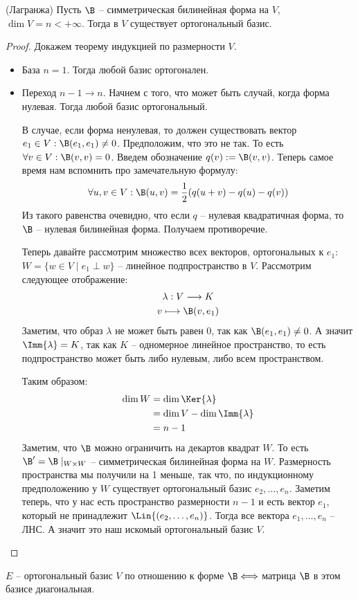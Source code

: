 \begin{theorem}
    (Лагранжа) Пусть $\B$ -- симметрическая билинейная форма на $V$, $\dim V = n < + \infty$. Тогда в $V$ существует ортогональный
    базис.
\end{theorem}
\begin{proof}
    Докажем теорему индукцией по размерности $V$. 
    \begin{itemize}
        \item База $n = 1$. Тогда любой базис ортогонален. 
        \item Переход $n-1 \to n$. Начнем с того, что может быть случай, когда форма нулевая. Тогда любой базис ортогональный. 
        
        В случае, если форма ненулевая, то должен существовать вектор $e_1 \in V : \B(e_1, e_1) \neq 0$. Предположим, что это не так. 
        То есть $\forall v \in V : \B(v, v) = 0$. Введем обозначение $q(v) := \B(v, v)$. Теперь самое время нам вспомнить про замечательную формулу: 
        \begin{gather*}
            \forall u, v \in V : \B(u, v) = \frac{1}{2} (q(u+v) - q(u) - q(v))
        \end{gather*}
        Из такого равенства очевидно, что если $q$ -- нулевая квадратичная форма, то $\B$ -- нулевая билинейная форма. Получаем противоречие.

        Теперь давайте рассмотрим множество всех векторов, ортогональных к $e_1$: $W = \{ w \in V \mid e_1 \perp w \}$ -- линейное подпространство в $V$. 
        Рассмотрим следующее отображение: 
        \begin{gather*}
            \lambda: V \longrightarrow K \\
            v \longmapsto \B(v, e_1)
        \end{gather*}
        Заметим, что образ $\lambda$ не может быть равен 0, так как $\B(e_1, e_1) \neq 0$. А значит $\Imm{\lambda} = K$, так как $K$ -- одномерное линейное пространство, то есть 
        подпространство может быть либо нулевым, либо всем пространством. 

        Таким образом:
        \begin{align*}
            \dim{W} &= \dim{\Ker{\lambda}} \\
            &= \dim{V} - \dim{\Imm{\lambda}} \\
            &= n - 1
        \end{align*}
        Заметим, что $\B$ можно ограничить на декартов квадрат $W$. То есть $\B' = \B \mid_{W \times W}$ -- симметрическая билинейная форма на $W$. Размерность пространства мы получили 
        на 1 меньше, так что, по индукционному предположению у 
        $W$ существует ортогональный базис $e_2, \dots, e_n$. Заметим теперь, что у нас есть пространство размерности $n-1$ и есть вектор $e_1$, который не принадлежит $\Lin{(e_2, \dots, e_n)}$. Тогда все 
        вектора $e_1, \dots, e_n$ -- ЛНС. А значит это наш искомый ортогональный базис $V$. 
    \end{itemize}
\end{proof}    
\notice $E$ -- ортогональный базис $V$ по отношению к форме $\B \Longleftrightarrow$ матрица $\B$ в этом базисе диагональная.

